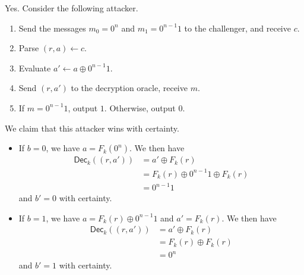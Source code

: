 \documentclass{article}
\theoremstyle{definition}
\begin{document}
Yes.
Consider the following attacker.
\begin{enumerate}
    \item Send the messages $m_0=0^n$ and $m_1=0^{n-1}1$ to the challenger, and receive $c$.
    \item Parse $(r, a)\gets c$.
    \item Evaluate $a'\gets a\oplus 0^{n-1}1$.
    \item Send $(r, a')$ to the decryption oracle, receive $m$.
    \item If $m=0^{n-1}1$, output $1$. Otherwise, output $0$.
\end{enumerate}
We claim that this attacker wins with certainty.
\begin{itemize}
    \item If $b=0$, we have $a=F_k(0^n)$.
    We then have
    \begin{align*}
        \mathsf{Dec}_k((r, a'))&=a' \oplus F_k(r) \\
        &= F_k(r)\oplus 0^{n-1}1\oplus F_k(r) \\
        &= 0^{n-1}1
    \end{align*}
    and $b'=0$ with certainty.
    \item If $b=1$, we have $a=F_k(r)\oplus 0^{n-1}1$ and $a'=F_k(r)$.
    We then have
    \begin{align*}
        \mathsf{Dec}_k((r, a'))&=a' \oplus F_k(r) \\
        &= F_k(r)\oplus F_k(r) \\
        &= 0^n
    \end{align*}
    and $b'=1$ with certainty.
\end{itemize}
\end{document}
